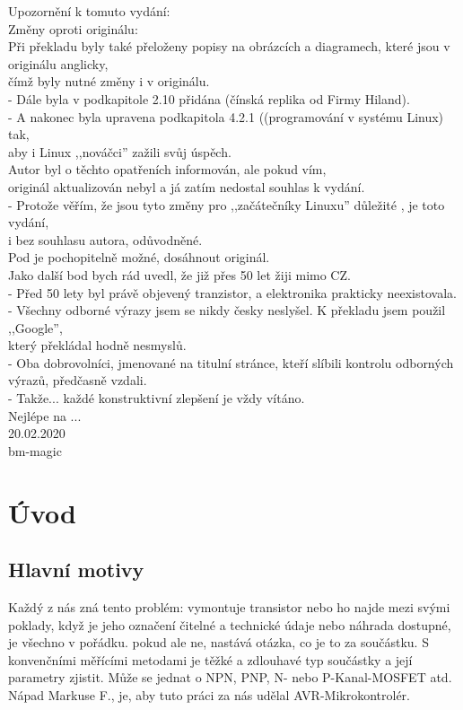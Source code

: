 Upozornění k tomuto vydání:
\vspace*{0.3cm}
\\Změny oproti originálu:
\\Při překladu byly také přeloženy popisy na obrázcích a diagramech, které jsou v originálu anglicky,
\\čímž byly nutné změny i v originálu. 
\\- Dále byla v podkapitole 2.10 přidána (čínská replika od Firmy Hiland).
\\- A nakonec byla upravena podkapitola 4.2.1 ((programování v systému Linux) tak,
\\aby i Linux ,,nováčci'' zažili svůj úspěch.
\vspace*{0.3cm}
\\Autor byl o těchto opatřeních informován, ale pokud vím,
\\originál aktualizován nebyl a já zatím nedostal souhlas k vydání.
\\ - Protože věřím, že jsou tyto změny pro ,,začátečníky Linuxu'' důležité , je toto vydání,
\\i bez souhlasu autora, odůvodněné.
\vspace*{0.3cm}
\\Pod \cite{khk} je pochopitelně možné, dosáhnout originál.
\vspace*{0.2cm}
\\Jako další bod bych rád uvedl, že již přes 50 let žiji mimo CZ.
\\- Před 50 lety byl právě objevený tranzistor, a elektronika prakticky neexistovala.
\\- Všechny odborné výrazy jsem se nikdy česky neslyšel. K překladu jsem použil ,,Google'',
\\který překládal hodně nesmyslů.
\\- Oba dobrovolníci, jmenované na titulní stránce, kteří slíbili kontrolu odborných výrazů, předčasně vzdali.
\\- Takže... každé konstruktivní zlepšení je vždy vítáno.
\\Nejlépe na \cite{Svetelektro}... 
\vspace*{0.2cm}
\\20.02.2020
\\ bm-magic 

\newpage
\section*{Úvod}

\subsection*{Hlavní motivy}
Každý z nás zná tento problém: vymontuje transistor nebo ho najde mezi svými poklady, když je jeho označení čitelné a technické údaje nebo náhrada dostupné, je všechno v pořádku.
pokud ale ne, nastává otázka, co je to za součástku.
S konvenčními měřícími metodami je těžké a zdlouhavé typ součástky a její parametry zjistit.
Může se jednat o NPN, PNP, N- nebo P-Kanal-MOSFET atd. 
Nápad Markuse F., je, aby tuto práci za nás udělal AVR-Mikrokontrolér.

